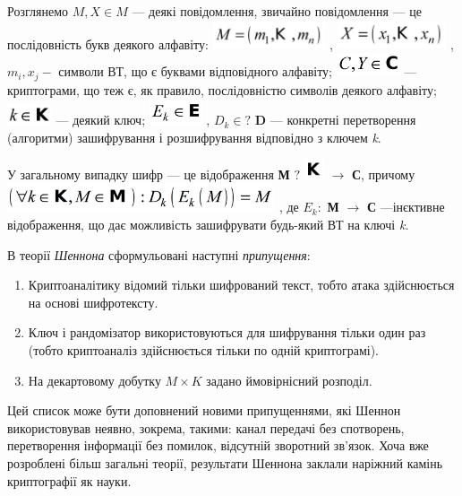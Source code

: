 Розглянемо  ${M,X\in M}$ --- деякі повідомлення, звичайно повідомлення --- це
послідовність букв  деякого алфавіту: 
\includegraphics[width=1.311in,height=0.3189in]{crypt-img/crypt-img6.png} , 
\includegraphics[width=1.2681in,height=0.3354in]{crypt-img/crypt-img7.png} , 
${m_{{i}},x_{{j}}-}$ символи ВТ, що є буквами відповідного алфавіту; 
\includegraphics[width=0.739in,height=0.2709in]{crypt-img/crypt-img8.png}  ---
криптограми, що теж є, як правило, послідовністю символів деякого алфавіту; 
\includegraphics[width=0.5193in,height=0.2311in]{crypt-img/crypt-img9.png}  ---
деякий ключ; 
\includegraphics[width=0.6146in,height=0.3016in]{crypt-img/crypt-img10.png} , 
${D_{{k}}\in ?}$ \textbf{D} --- конкретні перетворення (алгоритми) зашифрування і
розшифрування відповідно з ключем \textit{k}. 

У загальному випадку шифр --- це відображення \textbf{М} ${?}$
\includegraphics[width=0.2311in,height=0.2311in]{crypt-img/crypt-img11.png} 
${\rightarrow }$\textbf{ С}, причому
\includegraphics[width=3.1173in,height=0.3346in]{crypt-img/crypt-img12.png} , 
де   ${E_{{k}}:}$ \textbf{М} ${\rightarrow }$\textbf{ С}
---ін{\textquotesingle}єктивне відображення, що дає можливість зашифрувати 
будь-який ВТ на ключі \textit{k.}

В теорії \textit{Шеннона} сформульовані наступні \textit{припущення}:

\liststyleWWviiiNumxix
\begin{enumerate}
\item Криптоаналітику відомий тільки шифрований текст, тобто атака здійснюється
на основі шифротексту.
\item Ключ і рандомізатор використовуються для шифрування тільки один раз (тобто
криптоаналіз здійснюється тільки по одній криптограмі). 
\item На  декартовому добутку  ${M\times K}$ задано ймовірнісний розподіл.
\end{enumerate}
 Цей список може бути доповнений новими припущеннями, які Шеннон використовував
неявно, зокрема, такими:  канал передачі без спотворень, перетворення
інформації без помилок, відсутній зворотний зв’язок. Хоча вже розроблені більш
загальні теорії, результати Шеннона заклали наріжний камінь криптографії як
науки.

